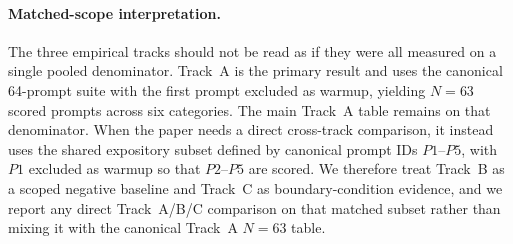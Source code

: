 
\paragraph{Matched-scope interpretation.}
The three empirical tracks should not be read as if they were all measured on a single pooled denominator. Track~A is the primary result and uses the canonical 64-prompt suite with the first prompt excluded as warmup, yielding $N{=}63$ scored prompts across six categories. The main Track~A table remains on that denominator. When the paper needs a direct cross-track comparison, it instead uses the shared expository subset defined by canonical prompt IDs $P1$--$P5$, with $P1$ excluded as warmup so that $P2$--$P5$ are scored. We therefore treat Track~B as a scoped negative baseline and Track~C as boundary-condition evidence, and we report any direct Track~A/B/C comparison on that matched subset rather than mixing it with the canonical Track~A $N{=}63$ table.
